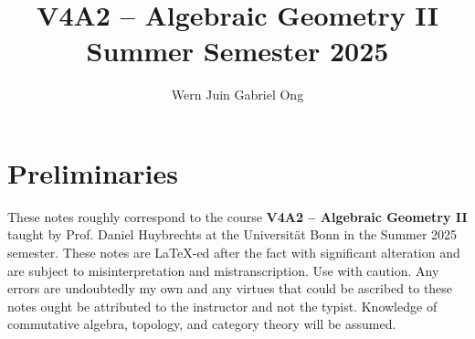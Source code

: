 \documentclass{amsart}
\theoremstyle{definition}
\numberwithin{equation}{section}
\begin{document}
\large
\title[Algebraic Geometry II -- Bonn, Summer 2025]{V4A2 -- Algebraic Geometry II \\ Summer Semester 2025}
\author{Wern Juin Gabriel Ong}
\address{Universit\"{a}t Bonn, Bonn, D-53113}
\maketitle
\section*{Preliminaries}
These notes roughly correspond to the course \textbf{V4A2 -- Algebraic Geometry II} taught by Prof. Daniel Huybrechts at the Universit\"{a}t Bonn in the Summer 2025 semester. These notes are \LaTeX-ed after the fact with significant alteration and are subject to misinterpretation and mistranscription. Use with caution. Any errors are undoubtedly my own and any virtues that could be ascribed to these notes ought be attributed to the instructor and not the typist. Knowledge of commutative algebra, topology, and category theory will be assumed. 
\newpage
\tableofcontents


\newpage
\printbibliography
\end{document}
